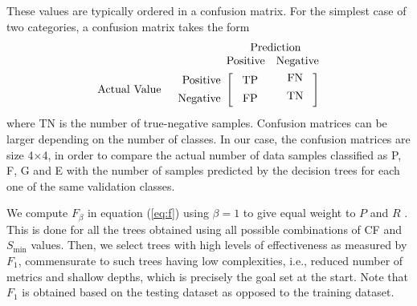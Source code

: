 These values are typically ordered in a confusion matrix. For the simplest case of two categories, a confusion matrix takes the form
%
\begin{equation}
\nonumber
\begin{array}{rr@{}rl}
	&					&	\multicolumn{2}{c}{\mathrm{Prediction}}		\\
	&					&	\mathrm{Positive}	&	\mathrm{Negative}	\\[0.75ex]
	\mathrm{Actual~Value}
	&	\begin{array}{r}
			\mathrm{Positive} \\[1ex]
			\mathrm{Negative}
		\end{array}
	&	\left[~
		\begin{array}{c}
			\mathrm{TP} \\[1ex]
			\mathrm{FP}
		\end{array}\right.
	&
		\left.
		\begin{array}{cc}
			~\mathrm{FN} \\[1ex]
			~\mathrm{TN} \\[1ex]
		\end{array}~\right]
\end{array}
\end{equation}
%
where TN is the number of true-negative samples. Confusion matrices can be larger depending on the number of classes. In our case, the confusion matrices are size 4$\times$4, in order to compare the actual number of data samples classified as P, F, G and E with the number of samples predicted by the decision trees for each one of the same validation classes.

We compute $F_{\beta}$ in equation (\ref{eq:f}) using $\beta = 1$ to give equal weight to $P$ and $R$ \citep{McCarthy_1995_Proc}. This is done for all the trees obtained using all possible combinations of CF and $S_{\min}$ values. Then, we select trees with high levels of effectiveness as measured by $F_1$, commensurate to such trees having low complexities, i.e., reduced number of metrics and shallow depths, which is precisely the goal set at the start. Note that $F_1$ is obtained based on the testing dataset as opposed to the training dataset.
